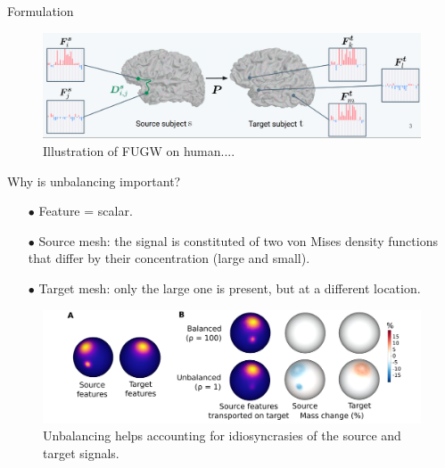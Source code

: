 \documentclass{beamer}
\begin{document}
\begin{frame}{Formulation}
\vspace{-0.5cm}
\begin{figure}
  \centering
  \includegraphics[width=1.\linewidth, keepaspectratio=true]{OT_new/fugw.png}
  \caption*{\scriptsize{Illustration of FUGW on human....}}
\end{figure}
\end{frame}

\begin{frame}{Why is unbalancing important?}
\scriptsize
\begin{itemize}
  \item[$\bullet$] Feature = scalar.
  \item[$\bullet$] Source mesh: the signal is constituted of two von Mises
  density functions that differ by their concentration (large and small).
  \item[$\bullet$] Target mesh: only the large one is present, but at a different location.
\end{itemize}
\vspace{0.2cm}
\begin{figure}
  \centering
  \includegraphics[width=1.\linewidth, keepaspectratio=true]{OT_new/toy_example.pdf}
  \caption*{\scriptsize{Unbalancing helps accounting for idiosyncrasies of the source and target signals.}}
\end{figure}


\end{frame}
\end{document}
